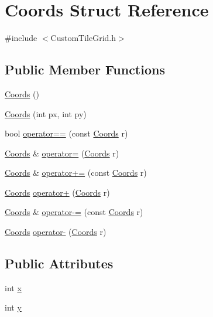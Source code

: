 \hypertarget{struct_coords}{\section{\-Coords \-Struct \-Reference}
\label{struct_coords}
}


{\ttfamily \#include $<$\-Custom\-Tile\-Grid.\-h$>$}

\subsection*{\-Public \-Member \-Functions}
\begin{DoxyCompactItemize}
\item 
\hyperlink{struct_coords_a5922d1783cefa759950faa50ac347191}{\-Coords} ()
\item 
\hyperlink{struct_coords_aa268e580151ea70eec212852dd4c5f94}{\-Coords} (int px, int py)
\item 
bool \hyperlink{struct_coords_a7507f92d1feefa3355ae8e9edae34e54}{operator==} (const \hyperlink{struct_coords}{\-Coords} r)
\item 
\hyperlink{struct_coords}{\-Coords} \& \hyperlink{struct_coords_a62705975ff5dd29d606da6a9b2c1ca20}{operator=} (\hyperlink{struct_coords}{\-Coords} r)
\item 
\hyperlink{struct_coords}{\-Coords} \& \hyperlink{struct_coords_a2549173108b2479b62fd79b82ec54e01}{operator+=} (const \hyperlink{struct_coords}{\-Coords} r)
\item 
\hyperlink{struct_coords}{\-Coords} \hyperlink{struct_coords_a168a9ed9edbffaf04e67c5b39306ca99}{operator+} (\hyperlink{struct_coords}{\-Coords} r)
\item 
\hyperlink{struct_coords}{\-Coords} \& \hyperlink{struct_coords_a9f61875c64b3726afd0bb0d465889bad}{operator-\/=} (const \hyperlink{struct_coords}{\-Coords} r)
\item 
\hyperlink{struct_coords}{\-Coords} \hyperlink{struct_coords_a7cc7a225781b6bbad3e00a5e9572fee1}{operator-\/} (\hyperlink{struct_coords}{\-Coords} r)
\end{DoxyCompactItemize}
\subsection*{\-Public \-Attributes}
\begin{DoxyCompactItemize}
\item 
int \hyperlink{struct_coords_a59992d986e76375f31828d32c05cd15d}{x}
\item 
int \hyperlink{struct_coords_a7ed64d02fb7550f1506a93fcfab7f16f}{y}
\end{DoxyCompactItemize}


